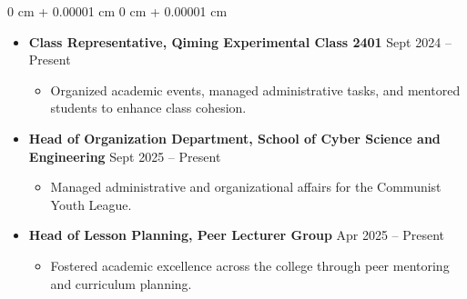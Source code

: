 \documentclass[10pt, letterpaper]{article}
\newenvironment{highlights}{
    \begin{itemize}[
    topsep=0.05 cm,
    parsep=0.02 cm,
    partopsep=0pt,
    itemsep=0pt,
    leftmargin=0 cm + 10pt
    ]
}{
\end{itemize}
} %
\newenvironment{highlightsforbulletentries}{
    \begin{itemize}[
    topsep=0.05 cm,
    parsep=0.02 cm,
    partopsep=0pt,
    itemsep=0pt,
    leftmargin=10pt
    ]
}{
\end{itemize}
} %
\newenvironment{onecolentry}{
    \begin{adjustwidth}{
        0 cm + 0.00001 cm
    }{
        0 cm + 0.00001 cm
    }
}{
\end{adjustwidth}
} %
\begin{document}
\begin{onecolentry}
    \begin{highlights}
        \item \textbf{Class Representative, Qiming Experimental Class 2401} \hfill Sept 2024 -- Present
        \begin{highlightsforbulletentries}
            \item Organized academic events, managed administrative tasks, and mentored students to enhance class cohesion.
        \end{highlightsforbulletentries}

        \item \textbf{Head of Organization Department, School of Cyber Science and Engineering} \hfill Sept 2025 -- Present
        \begin{highlightsforbulletentries}
            \item Managed administrative and organizational affairs for the Communist Youth League.
        \end{highlightsforbulletentries}

        \item \textbf{Head of Lesson Planning, Peer Lecturer Group} \hfill Apr 2025 -- Present
        \begin{highlightsforbulletentries}
            \item Fostered academic excellence across the college through peer mentoring and curriculum planning.
        \end{highlightsforbulletentries}
    \end{highlights}
\end{onecolentry}
\end{document}
